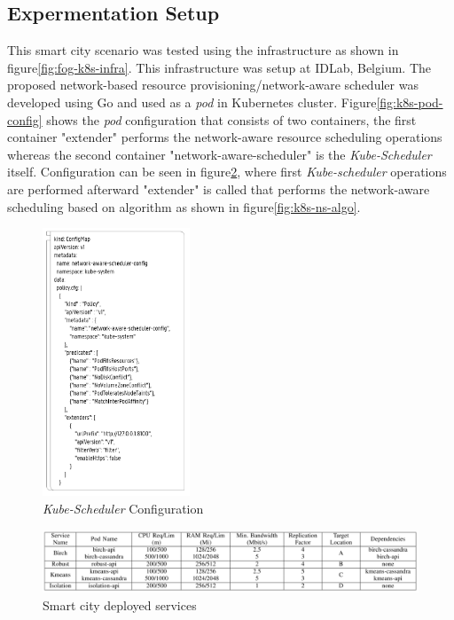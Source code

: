 \subsection{Expermentation Setup}
\label{sec:setup}
This smart city scenario was tested using the infrastructure as shown in figure\ref{fig:fog-k8s-infra}. This infrastructure was setup at IDLab, Belgium\cite{Santos2019}. The proposed network-based resource provisioning/network-aware scheduler was developed using Go and used as a \emph{pod} in Kubernetes cluster\cite{Santos2019}. Figure\ref{fig:k8s-pod-config} shows the \emph{pod} configuration that consists of two containers, the first container "extender" performs the network-aware resource scheduling operations whereas the second container "network-aware-scheduler" is the \emph{Kube-Scheduler} itself\cite{Santos2019}. Configuration can be seen in figure\ref{fig:k8s-sch-config}, where first \emph{Kube-scheduler} operations are performed afterward "extender" is called that performs the network-aware scheduling based on algorithm\cite{Santos2019} as shown in figure\ref{fig:k8s-ns-algo}. \par
\begin{figure}
  \centering
  \includegraphics[width=\linewidth, height=8cm]{figures/mlcn-k8s-scheduler-config.pdf}
  \caption{\emph{Kube-Scheduler} Configuration\cite{Santos2019}}
  \label{fig:k8s-sch-config}
\end{figure}
\begin{figure}
  \includegraphics[width=\linewidth]{figures/mlcn-k8s-service-pods.pdf}
  \caption{Smart city deployed services\cite{Santos2019}}
  \label{fig:k8s-sch-config}
\end{figure}
